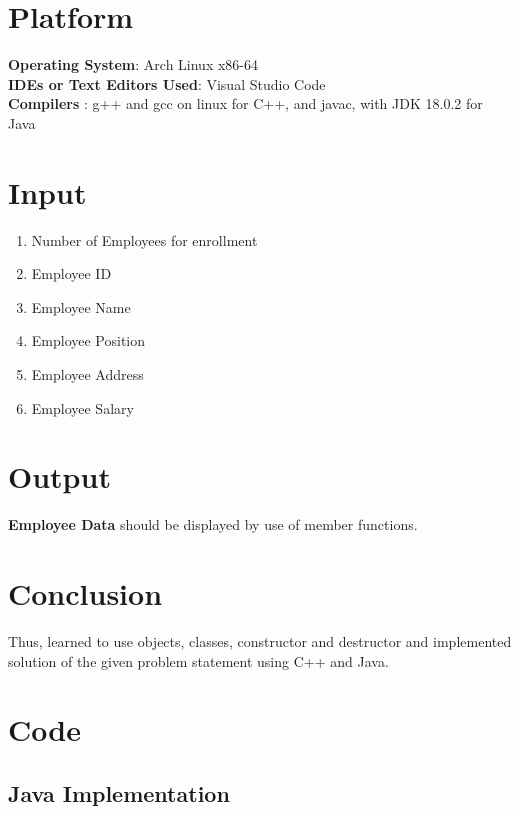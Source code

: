 \documentclass[11pt]{article}
\begin{document}
\section{Platform}
	\textbf{Operating System}: Arch Linux x86-64\\
	\textbf{IDEs or Text Editors Used}: Visual Studio Code\\
	\textbf{Compilers} : g++ and gcc on linux for C++, and javac, with JDK 18.0.2 for Java\\

\section{Input}

\begin{enumerate}
	\item Number of Employees for enrollment
	\item Employee ID
	\item Employee Name
	\item Employee Position
	\item Employee Address
	\item Employee Salary
\end{enumerate}

\section{Output}

\textbf{Employee Data} should be displayed by use of member functions. 

\section{Conclusion}
Thus, learned to use objects, classes, constructor and destructor and implemented solution
of the given problem statement using C++ and Java.

\section{Code}

\subsection{Java Implementation}


\end{document}
